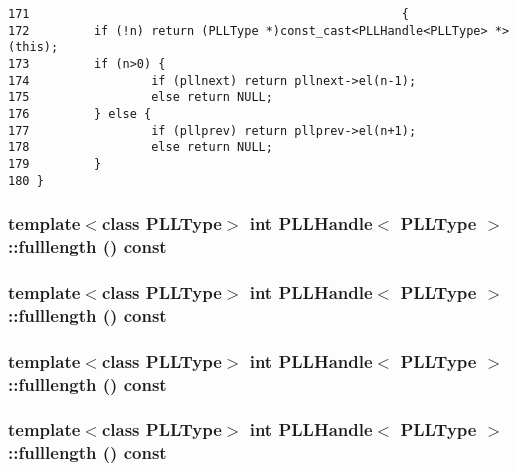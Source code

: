 \footnotesize\begin{verbatim}171                                                    { 
172         if (!n) return (PLLType *)const_cast<PLLHandle<PLLType> *>(this); 
173         if (n>0) { 
174                 if (pllnext) return pllnext->el(n-1); 
175                 else return NULL; 
176         } else { 
177                 if (pllprev) return pllprev->el(n+1); 
178                 else return NULL; 
179         } 
180 } 
\end{verbatim}\normalsize 
{}
\subsubsection{\setlength{\rightskip}{0pt plus 5cm}template$<$class PLLType$>$ int PLLHandle$<$ {\bf PLLType} $>$::fulllength () const\hspace{0.3cm}{\tt  [inline]}}\label{classPLLHandle_a48}


\subsubsection{\setlength{\rightskip}{0pt plus 5cm}template$<$class PLLType$>$ int PLLHandle$<$ {\bf PLLType} $>$::fulllength () const\hspace{0.3cm}{\tt  [inline]}}\label{classPLLHandle_a35}


\subsubsection{\setlength{\rightskip}{0pt plus 5cm}template$<$class PLLType$>$ int PLLHandle$<$ {\bf PLLType} $>$::fulllength () const\hspace{0.3cm}{\tt  [inline]}}\label{classPLLHandle_a22}


\subsubsection{\setlength{\rightskip}{0pt plus 5cm}template$<$class PLLType$>$ int PLLHandle$<$ {\bf PLLType} $>$::fulllength () const\hspace{0.3cm}{\tt  [inline]}}\label{classPLLHandle_a9}





